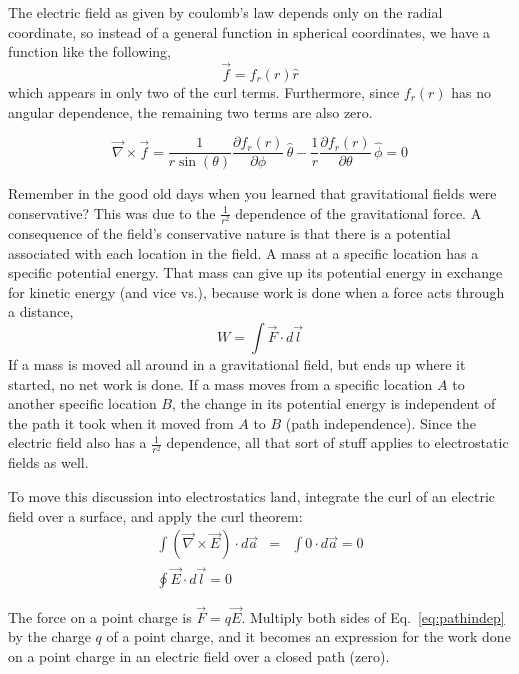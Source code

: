 \documentclass[12pt]{article}
\begin{document}
\begin{flushleft}
\vspace{.2in}
The electric field as given by coulomb's law depends only on the radial coordinate, so instead of a general function in spherical coordinates, we have a function like the following,
\[
\vec{f} = f_{r}(r)\hat{r} 
\]
which appears in only two of the curl terms.  Furthermore, since $f_{r}(r)$ has no angular dependence, the remaining two terms are also zero.

\begin{equation*}
\vec{\nabla} \times \vec{f}  = \frac{1}{r\sin{(\theta)}}\frac{\partial f_{r}(r) }{\partial \phi} \, \hat{\theta} 
  - \frac{1}{r}  \frac{ \partial f_{r}(r) } { \partial \theta } \, \hat{\phi} = 0
\end{equation*}

Remember in the good old days when you learned that gravitational fields were conservative?  This was due to the $\frac{1}{r^{2}}$ dependence of the gravitational force.  A consequence of the field's conservative nature is that there is a potential associated with each location in the field.  A mass at a specific location has a specific potential energy.  That mass can give up its potential energy in exchange for kinetic energy (and vice vs.), because work is done when a force acts through a distance,
\[
W=\int \vec{F} \cdot d\vec{l}
\]
If a mass is moved all around in a gravitational field, but ends up where it started, no net work is done.  If a  mass moves from a specific location $A$ to another specific location $B$, the change in its potential energy is independent of the path it took when it moved from $A$ to $B$ (path independence).  Since the electric field also has a $\frac{1}{r^{2}}$ dependence, all that sort of stuff applies to electrostatic fields as well.

To move this discussion into electrostatics land, integrate the curl of an electric field over a surface, and apply the curl theorem:
\begin{eqnarray}
\int \left( \vec{\nabla} \times \vec{E} \right) \cdot d\vec{a} & = & \int 0 \cdot d\vec{a} = 0 \nonumber \\
\oint \vec{E} \cdot  d\vec{l} = 0  \label{eq:pathindep}
\end{eqnarray}

The force on a point charge is $\vec{F}=q\vec{E}$.  Multiply both sides of  Eq.~\ref{eq:pathindep} by the charge $q$ of a point charge, and it becomes an expression for the work done on a point charge in an electric field over a closed path (zero).


\end{flushleft}
\end{document}
